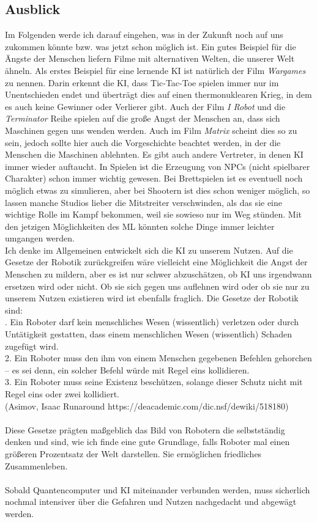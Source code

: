 \documentclass[12pt,a4paper]{article}
\begin{document}
	\subsection{Ausblick}
	Im Folgenden werde ich darauf eingehen, was in der Zukunft noch auf uns zukommen könnte bzw. was jetzt schon möglich ist. Ein gutes Beispiel für die Ängste der Menschen liefern Filme mit alternativen Welten, die unserer Welt ähneln. Als erstes Beispiel für eine lernende KI ist natürlich der Film \textit{Wargames} zu nennen. Darin erkennt die KI, dass Tic-Tac-Toe spielen immer nur im Unentschieden endet und überträgt dies auf einen thermonuklearen Krieg, in dem es auch keine Gewinner oder Verlierer gibt. Auch der Film \textit{I Robot} und die \textit{Terminator} Reihe spielen auf die große Angst der Menschen an, dass sich Maschinen gegen uns wenden werden. Auch im Film \textit{Matrix} scheint dies so zu sein, jedoch sollte hier auch die Vorgeschichte beachtet werden, in der die Menschen die Maschinen ablehnten. Es gibt auch andere Vertreter, in denen KI immer wieder auftaucht. In Spielen ist die Erzeugung von NPCs (nicht spielbarer Charakter) schon immer wichtig gewesen. Bei Brettspielen ist es eventuell noch möglich etwas zu simulieren, aber bei Shootern ist dies schon weniger möglich, so lassen manche Studios lieber die Mitstreiter verschwinden, als das sie eine wichtige Rolle im Kampf bekommen, weil sie sowieso nur im Weg stünden. Mit den jetzigen Möglichkeiten des ML könnten solche Dinge immer leichter umgangen werden.\\
	Ich denke im Allgemeinen entwickelt sich die KI zu unserem Nutzen. Auf die Gesetze der Robotik zurückgreifen wäre vielleicht eine Möglichkeit die Angst der Menschen zu mildern, aber es ist nur schwer abzuschätzen, ob KI uns irgendwann ersetzen wird oder nicht. Ob sie sich gegen uns auflehnen wird oder ob sie nur zu unserem Nutzen existieren wird ist ebenfalls fraglich. Die Gesetze der Robotik sind:\\
	. Ein Roboter darf kein menschliches Wesen (wissentlich) verletzen oder durch Untätigkeit gestatten, dass einem menschlichen Wesen (wissentlich) Schaden zugefügt wird.\\
	2. Ein Roboter muss den ihm von einem Menschen gegebenen Befehlen gehorchen – es sei denn, ein solcher Befehl würde mit Regel eins kollidieren.\\
	3. Ein Roboter muss seine Existenz beschützen, solange dieser Schutz nicht mit Regel eins oder zwei kollidiert.\grqq{}\\
	(Asimov, Isaac \glqq Runaround\grqq{} https://deacademic.com/dic.nsf/dewiki/518180)\\\\
	Diese Gesetze prägten maßgeblich das Bild von Robotern die selbstständig denken und sind, wie ich finde eine gute Grundlage, falls Roboter mal einen größeren Prozentsatz der Welt darstellen. Sie ermöglichen friedliches Zusammenleben.\\\\
	Sobald Quantencomputer und KI miteinander verbunden werden, muss sicherlich nochmal intensiver über die Gefahren und Nutzen nachgedacht und abgewägt werden.
	\newpage
\end{document}
